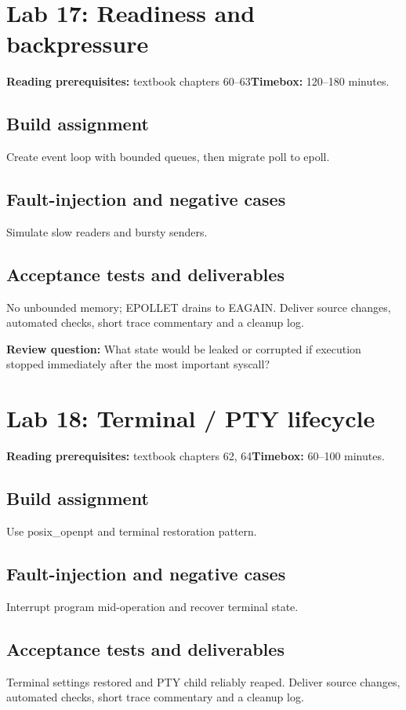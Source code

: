 \documentclass[11pt,letterpaper,oneside]{report}
\begin{document}
\section{Lab 17: Readiness and backpressure}
\textbf{Reading prerequisites:} textbook chapters 60--63\quad \textbf{Timebox:} 120--180 minutes.

\subsection{Build assignment}
Create event loop with bounded queues, then migrate poll to epoll.

\subsection{Fault-injection and negative cases}
Simulate slow readers and bursty senders.

\subsection{Acceptance tests and deliverables}
No unbounded memory; EPOLLET drains to EAGAIN. Deliver source changes, automated checks, short trace commentary and a cleanup log.

\textbf{Review question:} What state would be leaked or corrupted if execution stopped immediately after the most important syscall?

\section{Lab 18: Terminal / PTY lifecycle}
\textbf{Reading prerequisites:} textbook chapters 62, 64\quad \textbf{Timebox:} 60--100 minutes.

\subsection{Build assignment}
Use posix\_openpt and terminal restoration pattern.

\subsection{Fault-injection and negative cases}
Interrupt program mid-operation and recover terminal state.

\subsection{Acceptance tests and deliverables}
Terminal settings restored and PTY child reliably reaped. Deliver source changes, automated checks, short trace commentary and a cleanup log.
\end{document}
